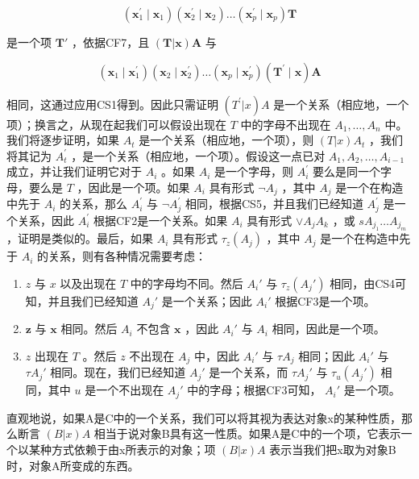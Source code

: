 \[
\left(\boldsymbol {x} _ {1} ^ {\prime} \mid \boldsymbol {x} _ {1}\right) \left(\boldsymbol {x} _ {2} ^ {\prime} \mid \boldsymbol {x} _ {2}\right) \dots \left(\boldsymbol {x} _ {p} ^ {\prime} \mid \boldsymbol {x} _ {p}\right) \boldsymbol {T}
\]

是一个项 \(\pmb{T}'\) ，依据CF7，且 \((\pmb{T}|\pmb{x})\pmb{A}\) 与

\[
\left(\boldsymbol {x} _ {1} \mid \boldsymbol {x} _ {1} ^ {\prime}\right) \left(\boldsymbol {x} _ {2} \mid \boldsymbol {x} _ {2} ^ {\prime}\right) \dots \left(\boldsymbol {x} _ {p} \mid \boldsymbol {x} _ {p} ^ {\prime}\right) \left(\boldsymbol {T} ^ {\prime} \mid \boldsymbol {x}\right) \boldsymbol {A}
\]

相同，这通过应用CS1得到。因此只需证明 \((T^{\prime}|x)A\) 是一个关系（相应地，一个项）；换言之，从现在起我们可以假设出现在 \(T\) 中的字母不出现在 \(A_{1},\ldots ,A_{n}\) 中。我们将逐步证明，如果 \(A_{t}\) 是一个关系（相应地，一个项），则 \((T|x)A_{t}\) ，我们将其记为 \(A_{t}^{\prime}\) ，是一个关系（相应地，一个项）。假设这一点已对 \(A_{1},A_{2},\ldots ,A_{i - 1}\) 成立，并让我们证明它对于 \(A_{i}\) 。如果 \(A_{i}\) 是一个字母，则 \(A_{i}^{\prime}\) 要么是同一个字母，要么是 \(T\) ，因此是一个项。如果 \(A_{i}\) 具有形式 \(\lnot A_j\) ，其中 \(A_{j}\) 是一个在构造中先于 \(A_{i}\) 的关系，那么 \(A_{i}^{\prime}\) 与 \(\lnot A_j^{\prime}\) 相同，根据CS5，并且我们已经知道 \(A_{j}^{\prime}\) 是一个关系，因此 \(A_{i}^{\prime}\) 根据CF2是一个关系。如果 \(A_{i}\) 具有形式 \(\vee A_{j}A_{k}\) ，或 \(sA_{j_1}\ldots A_{j_m}\) ，证明是类似的。最后，如果 \(A_{i}\) 具有形式 \(\tau_{z}(A_j)\) ，其中 \(A_{j}\) 是一个在构造中先于 \(A_{i}\) 的关系，则有各种情况需要考虑：

\begin{enumerate}
\def\labelenumi{(\alph{enumi})}
\item
  \(z\) 与 \(x\) 以及出现在 \(T\) 中的字母均不同。然后 \(A_i'\) 与 \(\tau_z(A_j')\) 相同，由CS4可知，并且我们已经知道 \(A_j'\) 是一个关系；因此 \(A_i'\) 根据CF3是一个项。
\item
  \(\pmb{z}\) 与 \(\pmb{x}\) 相同。然后 \(A_{i}\) 不包含 \(\pmb{x}\) ，因此 \(A_{i}'\) 与 \(A_{i}\) 相同，因此是一个项。
\item
  \(z\) 出现在 \(T\) 。然后 \(z\) 不出现在 \(A_j\) 中，因此 \(A_i'\) 与 \(\tau A_j\) 相同；因此 \(A_i'\) 与 \(\tau A_j'\) 相同。现在，我们已经知道 \(A_j'\) 是一个关系，而 \(\tau A_j'\) 与 \(\tau_u(A_j')\) 相同，其中 \(u\) 是一个不出现在 \(A_j'\) 中的字母；根据CF3可知， \(A_i'\) 是一个项。
\end{enumerate}

直观地说，如果A是C中的一个关系，我们可以将其视为表达对象x的某种性质，那么断言 \((B|x)A\) 相当于说对象B具有这一性质。如果A是C中的一个项，它表示一个以某种方式依赖于由x所表示的对象；项 \((B|x)A\) 表示当我们把x取为对象B时，对象A所变成的东西。

